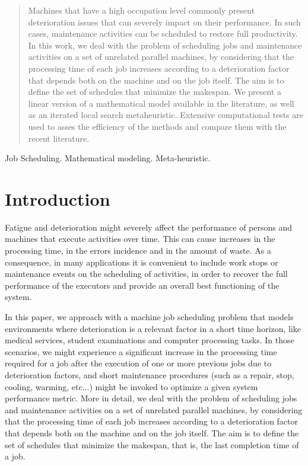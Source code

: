 \documentclass[a4paper,11pt]{article}
\begin{document}
\begin{abstract}
Machines that have a high occupation level commonly present deterioration issues that can severely impact on their performance. In such cases, maintenance activities can be scheduled to restore full productivity. In this work, we deal with the problem of scheduling jobs and maintenance activities on a set of unrelated parallel machines, by considering that the processing time of each job increases according to a deterioration factor that depends both on the machine and on the job itself. The aim is to define the set of schedules that minimize the makespan. 
We present a linear version of a mathematical model available in the literature, as well as an iterated local search metaheuristic. Extensive computational tests are used to asses the efficiency of the methods and compare them with the recent literature. 
\end{abstract}

\bigskip
\begin{keywords}Job Scheduling. Mathematical modeling. Meta-heuristic.

\bigskip
{}
\end{keywords}

\newpage
\section{Introduction} \label{sec:intro}
 
Fatigue and deterioration might severely affect the performance of persons and machines that execute activities over time. This can cause increases in the processing time, in the errors incidence and in the amount of waste. As a consequence, in many applications it is convenient to include work stops or maintenance events on the scheduling of activities, in order to recover the full performance of the executors and provide an overall best functioning of the system. 
 
 In this paper, we approach with a machine job scheduling problem that models environments where deterioration is a relevant factor in a short time horizon, like medical services, student examinations and computer processing tasks. In those scenarios, we might experience a significant increase in the processing time required for a job after the execution of one or more previous jobs due to deterioration factors, and short maintenance procedures (such as a repair, stop, cooling, warming, etc...) might be invoked to optimize a given system performance metric.  More in detail, we deal with the problem of scheduling jobs and maintenance activities on a set of unrelated parallel machines, by considering that the processing time of each job increases according to a deterioration factor that depends both on the machine and on the job itself. The aim is to define the set of schedules that minimize the makespan, that is, the last completion time of a job.
 
\end{document}
